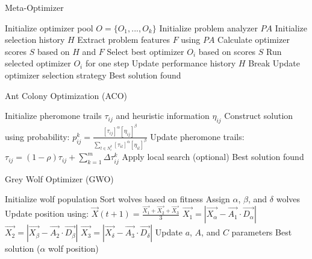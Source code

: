 \documentclass{article}
\begin{document}
\begin{algorithm}
\caption{Meta-Optimizer}
\begin{algorithmic}[1]
\State Initialize optimizer pool $O = \{O_1, ..., O_k\}$
\State Initialize problem analyzer $PA$
\State Initialize selection history $H$
    \State Extract problem features $F$ using $PA$
    \State Calculate optimizer scores $S$ based on $H$ and $F$
    \State Select best optimizer $O_i$ based on scores $S$
        \State Run selected optimizer $O_i$ for one step
        \State Update performance history $H$
            \State Break
        \EndIf
    \EndFor
    \State Update optimizer selection strategy
\EndWhile
\State \Return Best solution found
\end{algorithmic}
\end{algorithm}

\begin{algorithm}
\caption{Ant Colony Optimization (ACO)}
\begin{algorithmic}[1]
\State Initialize pheromone trails $\tau_{ij}$ and heuristic information $\eta_{ij}$
        \State Construct solution using probability:
        \State $p_{ij}^k = \frac{[\tau_{ij}]^\alpha[\eta_{ij}]^\beta}{\sum_{l\in N_i^k}[\tau_{il}]^\alpha[\eta_{il}]^\beta}$
    \EndFor
    \State Update pheromone trails:
    \State $\tau_{ij} = (1-\rho)\tau_{ij} + \sum_{k=1}^m \Delta\tau_{ij}^k$
    \State Apply local search (optional)
\EndWhile
\State \Return Best solution found
\end{algorithmic}
\end{algorithm}

\begin{algorithm}
\caption{Grey Wolf Optimizer (GWO)}
\begin{algorithmic}[1]
\State Initialize wolf population
    \State Sort wolves based on fitness
    \State Assign $\alpha$, $\beta$, and $\delta$ wolves
        \State Update position using:
        \State $\vec{X}(t+1) = \frac{\vec{X_1} + \vec{X_2} + \vec{X_3}}{3}$
        \Where
        \State $\vec{X_1} = |\vec{X_\alpha} - \vec{A_1}\cdot\vec{D_\alpha}|$
        \State $\vec{X_2} = |\vec{X_\beta} - \vec{A_2}\cdot\vec{D_\beta}|$
        \State $\vec{X_3} = |\vec{X_\delta} - \vec{A_3}\cdot\vec{D_\delta}|$
    \EndFor
    \State Update $a$, $A$, and $C$ parameters
\EndWhile
\State \Return Best solution ($\alpha$ wolf position)
\end{algorithmic}
\end{algorithm}
\end{document}
